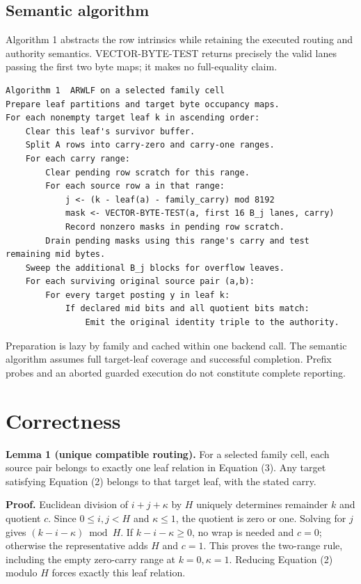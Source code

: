 \documentclass[manuscript,screen,review]{acmart}
\begin{document}
\subsection{Semantic algorithm}
Algorithm 1 abstracts the row intrinsics while retaining the executed routing and authority semantics. VECTOR-BYTE-TEST returns precisely the valid lanes passing the first two byte maps; it makes no full-equality claim.

\noindent\begin{minipage}{\linewidth}
\begin{lstlisting}[basicstyle=\ttfamily\small,breaklines=true,columns=fullflexible,keepspaces=true]
Algorithm 1  ARWLF on a selected family cell
Prepare leaf partitions and target byte occupancy maps.
For each nonempty target leaf k in ascending order:
    Clear this leaf's survivor buffer.
    Split A rows into carry-zero and carry-one ranges.
    For each carry range:
        Clear pending row scratch for this range.
        For each source row a in that range:
            j <- (k - leaf(a) - family_carry) mod 8192
            mask <- VECTOR-BYTE-TEST(a, first 16 B_j lanes, carry)
            Record nonzero masks in pending row scratch.
        Drain pending masks using this range's carry and test remaining mid bytes.
    Sweep the additional B_j blocks for overflow leaves.
    For each surviving original source pair (a,b):
        For every target posting y in leaf k:
            If declared mid bits and all quotient bits match:
                Emit the original identity triple to the authority.
\end{lstlisting}
\end{minipage}
Preparation is lazy by family and cached within one backend call. The semantic algorithm assumes full target-leaf coverage and successful completion. Prefix probes and an aborted guarded execution do not constitute complete reporting.

\section{Correctness}
\textbf{Lemma 1 (unique compatible routing).} For a selected family cell, each source pair belongs to exactly one leaf relation in Equation (3). Any target satisfying Equation (2) belongs to that target leaf, with the stated carry.

\textbf{Proof.} Euclidean division of $i+j+\kappa$ by $H$ uniquely determines remainder $k$ and quotient $c$. Since $0\leq i,j<H$ and $\kappa\leq1$, the quotient is zero or one. Solving for $j$ gives $(k-i-\kappa)\bmod H$. If $k-i-\kappa\geq0$, no wrap is needed and $c=0$; otherwise the representative adds $H$ and $c=1$. This proves the two-range rule, including the empty zero-carry range at $k=0,\kappa=1$. Reducing Equation (2) modulo $H$ forces exactly this leaf relation.
\end{document}
